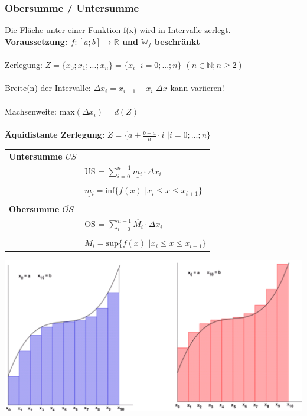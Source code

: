 		\subsubsection{Obersumme / Untersumme}
		Die Fläche unter einer Funktion f(x) wird in Intervalle zerlegt.\\
		\textbf{Voraussetzung: $f: [a;b] \rightarrow \mathbb{R}$ und $\mathbb{W}_f$ beschränkt} \\
		\\
		Zerlegung: $Z = \lbrace x_0; x_1; ... ; x_n \rbrace = \lbrace x_i$  $\vert i=0; ... ; n \rbrace$ \quad $(n \in \mathbb{N}; n \geq 2)$ \\
		\\
		Breite(n) der Intervalle: $\Delta x_i = x_{i+1} - x_i$ \quad $\Delta x$ kann variieren!\\
		\\
		Machsenweite: $\mathrm{max}(\Delta x_i) = d(Z)$  \\
		\\
		\textbf{Äquidistante Zerlegung:} $Z = \lbrace a + \frac{b-a}{n} \cdot i $ $\vert i=0; ...; n \rbrace$ \\
		
		\begin{tabular}{ll}
		\textbf{Untersumme $\underline{US}$} & \\
		& US = $\sum \limits_{i=0}^{n-1} \underline{m_i} \cdot \Delta x_i$ \\
		\\
		& $\underline{m_i} = \mathrm{inf} \lbrace f(x)$ $\vert x_i \leq x \leq x_{i+1} \rbrace$ \\
		\\
		\textbf{Obersumme $\overline{OS}$} &	 \\
		& OS = $\sum \limits_{i=0}^{n-1} \overline{M_i} \cdot \Delta x_i$ \\
		\\
		& $\overline{M_i} = \mathrm{sup} \lbrace f(x)$ $\vert x_i \leq x \leq x_{i+1} \rbrace$ \\
		\end{tabular}
		
		\includegraphics[width=0.8\linewidth]{Bilder/obersumme-untersumme} \\
		
